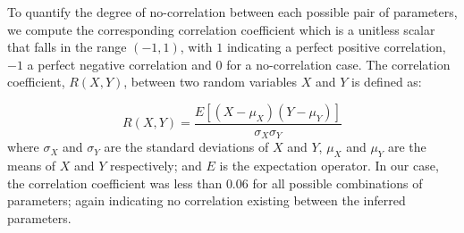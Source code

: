 To quantify the degree of no-correlation between each possible pair of parameters, we compute 
the corresponding correlation coefficient which is a unitless scalar that falls in the range 
$(-1, 1)$, with $1$ indicating a perfect positive correlation, $−1$ a perfect negative correlation and $0$ for
a no-correlation case.
The correlation coefficient, $R(X, Y )$, between two random variables $X$ and $Y$ is defined as:

\begin{equation}
R(X,Y) = \frac{E[(X - \mu_X)(Y - \mu_Y )]}{\sigma_X \sigma_Y} 
\end{equation}
where $\sigma_X$ and  $\sigma_Y$ are the standard deviations of  $X$ and $Y$, $\mu_X$
and $\mu_Y$  are the means of  $X$ and $Y$ respectively;
and $E$ is the expectation operator.  In our case, the correlation coefficient
was less than $0.06$ for all possible combinations of parameters; again indicating no correlation
existing between the inferred parameters.







